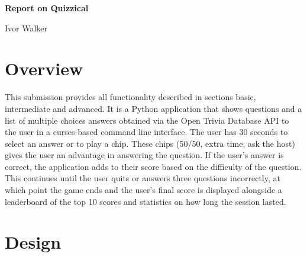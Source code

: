 \documentclass[12pt]{article}
\begin{document}
\begin{titlepage}
    \centering
    \vspace*{\fill}

    {\Huge \textbf{Report on Quizzical} \par}    
    \vspace{1cm}
    {\Large Ivor Walker\par}      
    \vspace{1cm}
    
    \vspace*{\fill}
\end{titlepage}


\section{Overview}

This submission provides all functionality described in sections basic, intermediate and advanced. It is a Python application that shows questions and a list of multiple choices answers obtained via the Open Trivia Database API to the user in a curses-based command line interface. The user has 30 seconds to select an answer or to play a chip. These chips (50/50, extra time, ask the host) gives the user an advantage in answering the question. If the user's answer is correct, the application adds to their score based on the difficulty of the question. This continues until the user quits or answers three questions incorrectly, at which point the game ends and the user's final score is displayed alongside a leaderboard of the top 10 scores and statistics on how long the session lasted.

\section{Design}
% 
\end{document}
